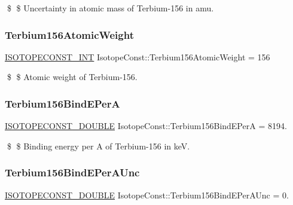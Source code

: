 \$ \$ Uncertainty in atomic mass of Terbium-\/156 in amu. \mbox{\label{group___isotope_const-_terbium-_tb156_ga6469ebef8ab052e2c792a7f9a0b26dae}} 
\subsubsection{\texorpdfstring{Terbium156\+Atomic\+Weight}{Terbium156AtomicWeight}}
{\footnotesize\ttfamily \mbox{\hyperlink{group___isotope_const-_macros_ga5f18360b3e99483a35c32d789e62621c}{I\+S\+O\+T\+O\+P\+E\+C\+O\+N\+S\+T\+\_\+\+I\+NT}} Isotope\+Const\+::\+Terbium156\+Atomic\+Weight = 156}

\$ \$ Atomic weight of Terbium-\/156. \mbox{\label{group___isotope_const-_terbium-_tb156_ga3df6abf736498b2cf5d17b30ed98e92f}} 
\subsubsection{\texorpdfstring{Terbium156\+Bind\+E\+PerA}{Terbium156BindEPerA}}
{\footnotesize\ttfamily \mbox{\hyperlink{group___isotope_const-_macros_ga8f45a7272ce02c0b4c65c44636ed719a}{I\+S\+O\+T\+O\+P\+E\+C\+O\+N\+S\+T\+\_\+\+D\+O\+U\+B\+LE}} Isotope\+Const\+::\+Terbium156\+Bind\+E\+PerA = 8194.}

\$ \$ Binding energy per A of Terbium-\/156 in keV. \mbox{\label{group___isotope_const-_terbium-_tb156_ga38b7d665c34a7aa90481227f2898f082}} 
\subsubsection{\texorpdfstring{Terbium156\+Bind\+E\+Per\+A\+Unc}{Terbium156BindEPerAUnc}}
{\footnotesize\ttfamily \mbox{\hyperlink{group___isotope_const-_macros_ga8f45a7272ce02c0b4c65c44636ed719a}{I\+S\+O\+T\+O\+P\+E\+C\+O\+N\+S\+T\+\_\+\+D\+O\+U\+B\+LE}} Isotope\+Const\+::\+Terbium156\+Bind\+E\+Per\+A\+Unc = 0.}

